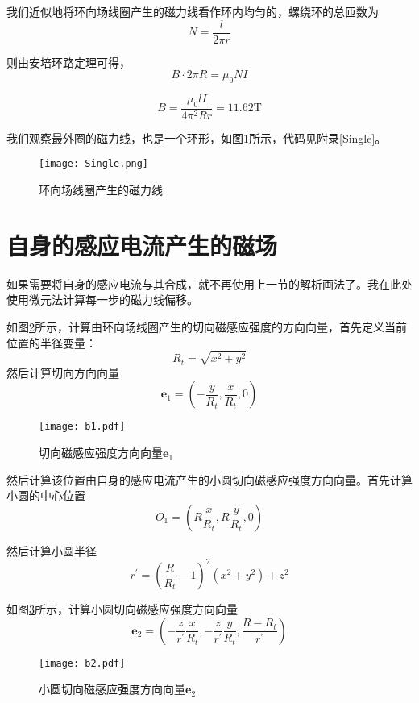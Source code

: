 \documentclass[a4paper,12pt]{article}
\begin{document}
\begin{CJK}{UTF8}{gbsn}
我们近似地将环向场线圈产生的磁力线看作环内均匀的，螺绕环的总匝数为
\begin{equation}
    N = \frac{l}{2\pi r}
\end{equation}

则由安培环路定理可得，
\begin{equation}
    B\cdot 2\pi R = \mu_0 NI
\end{equation}

\begin{equation*}
    B = \frac{\mu_0lI}{4\pi^2Rr}=11.62\text{T}
\end{equation*}

我们观察最外圈的磁力线，也是一个环形，如图\ref{Singles}所示，代码见附录\ref{Single}。

\begin{figure}[H]
    \centering
    \texttt{[image: Single.png]}
    \caption{环向场线圈产生的磁力线}
    \label{Singles}
\end{figure}

\section{自身的感应电流产生的磁场}

如果需要将自身的感应电流与其合成，就不再使用上一节的解析画法了。我在此处使用微元法计算每一步的磁力线偏移。

如图\ref{e1}所示，计算由环向场线圈产生的切向磁感应强度的方向向量，首先定义当前位置的半径变量：
$$
R_t = \sqrt{x^2+y^2}
$$
然后计算切向方向向量
$$
\textbf{e}_1 = \left( -\frac{y}{R_t}, \frac{x}{R_t}, 0 \right)
$$

\begin{figure}[H]
    \centering
    \texttt{[image: b1.pdf]}
    \caption{切向磁感应强度方向向量$\textbf{e}_1$}\label{e1}
\end{figure}

然后计算该位置由自身的感应电流产生的小圆切向磁感应强度方向向量。首先计算小圆的中心位置
$$
O_1=\left( R\frac{x}{R_t}, R\frac{y}{R_t}, 0\right)
$$

然后计算小圆半径
$$
r^{\prime} = \left(\frac{R}{R_t} - 1\right)^2(x^2+y^2) + z^2
$$

如图\ref{e2}所示，计算小圆切向磁感应强度方向向量
$$
\textbf{e}_2 = \left( -\frac{z}{r^\prime}\frac{x}{R_t}, -\frac{z}{r^\prime}\frac{y}{R_t}, \frac{R-R_t}{r^\prime} \right)
$$

\begin{figure}[H]
    \centering
    \texttt{[image: b2.pdf]}
    \caption{小圆切向磁感应强度方向向量$\textbf{e}_2$}\label{e2}
\end{figure}


\end{CJK}
\end{document}
